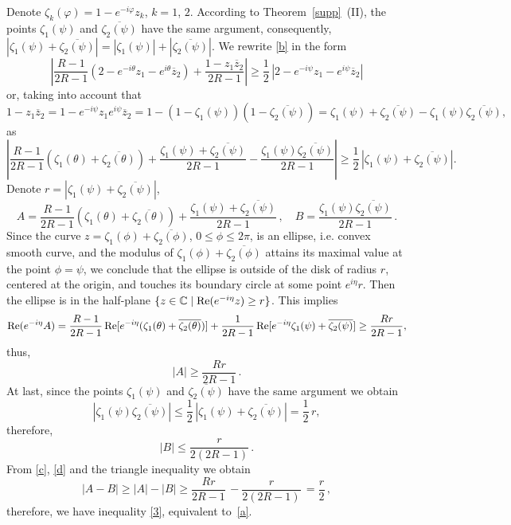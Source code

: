 \documentclass[12pt,a4paper]{amsart}
\def\Re{\mathop{\rm Re}\nolimits}
\begin{document}
Denote $\zeta_k(\varphi)=1-e^{-i\varphi}z_k$, $k=1$, $2$. According to Theorem~\ref{supp}~(II),  the points $\zeta_1(\psi)$ and $\overline{\zeta_2(\psi)}$ have the same argument, consequently,  $|\zeta_1(\psi)+\overline{\zeta_2(\psi)}|=|\zeta_1(\psi)|+|\overline{\zeta_2(\psi)}|$.
We rewrite \eqref{b} in the form
$$
\left|\frac{R-1}{2R-1}(2-e^{-i\theta}z_1-e^{i\theta}\overline{z}_2)+\frac{1-z_1\overline{z}_2}{2R-1}\right|\ge\frac{1}{2}\,|2-e^{-i\psi}z_1-e^{i\psi}\overline{z}_2|
$$
or, taking into account that $$1-z_1\overline{z}_2=1-e^{-i\psi}z_1e^{i\psi}\overline{z}_2=1-(1-\zeta_1(\psi))(1-\overline{\zeta_2(\psi)})=\zeta_1(\psi)+\overline{\zeta_2(\psi)}-\zeta_1(\psi)\overline{\zeta_2(\psi)},$$
as
\begin{equation}\label{3}
\left|\frac{R-1}{2R-1}(\zeta_1(\theta)+\overline{\zeta_2(\theta)})+\frac{\zeta_1(\psi)+\overline{\zeta_2(\psi)}}{2R-1}-\frac{\zeta_1(\psi)\overline{\zeta_2(\psi)}}{2R-1}\right|\ge\frac{1}{2}\,|
\zeta_1(\psi)+\overline{\zeta_2(\psi)}|.
\end{equation}
Denote $r=|
\zeta_1(\psi)+\overline{\zeta_2(\psi)}|$,
$$
A=\frac{R-1}{2R-1}(\zeta_1(\theta)+\overline{\zeta_2(\theta)})+\frac{\zeta_1(\psi)+\overline{\zeta_2(\psi)}}{2R-1}\,, \quad B=\frac{\zeta_1(\psi)\overline{\zeta_2(\psi)}}{2R-1}\,.
$$
 Since the curve  $z=\zeta_1(\phi)+\overline{\zeta_2(\phi)}$, $0\le\phi\le 2\pi$, is an ellipse, i.e. convex smooth  curve, and the modulus of $\zeta_1(\phi)+\overline{\zeta_2(\phi)}$ attains its maximal value at the point $\phi=\psi$, we conclude that the ellipse is outside of the disk of radius $r$, centered at the origin, and touches its boundary circle at some point $e^{i\eta}r$. Then the ellipse is in the half-plane $\{z\in \mathbb{C}\mid \Re (e^{-i\eta}z)\ge r\}$.   This implies
$$
\Re (e^{-i\eta}A)=\frac{R-1}{2R-1}\Re [e^{-i\eta}(\zeta_1(\theta)+\overline{\zeta_2(\theta)})]+\frac{1}{2R-1}\Re [e^{-i\eta}{\zeta_1(\psi)+\overline{\zeta_2(\psi)}}]
\ge \frac{Rr}{2R-1},
$$
thus,
\begin{equation}\label{c}
|A|\ge \frac{Rr}{2R-1}\,.
\end{equation}
At last, since the points $\zeta_1(\psi)$ and $\overline{\zeta_2(\psi)}$  have the same argument we obtain
$$
|\zeta_1(\psi)\overline{\zeta_2(\psi)}|\le \frac{1}{2}\, |\zeta_1(\psi)+\overline{\zeta_2(\psi)}|=\frac{1}{2}\,r,
$$
therefore,
\begin{equation}\label{d}
|B|\le \frac{r}{2(2R-1)}\,.
\end{equation}
From \eqref{c}, \eqref{d} and the triangle inequality we obtain
$$
|A-B|\ge|A|-|B|\ge  \frac{Rr}{2R-1}\,-\frac{r}{2(2R-1)}\,=\frac{r}{2}\,,
$$
therefore, we have inequality \eqref{3}, equivalent to~\eqref{a}.\medskip
\end{document}
